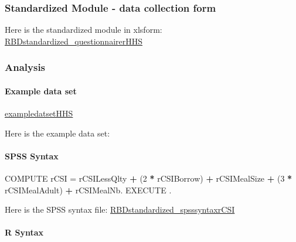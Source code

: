 \documentclass[
]{article}
\newenvironment{Shaded}{\begin{snugshade}}{\end{snugshade}}
\newcommand{\DecValTok}[1]{\textcolor[rgb]{0.00,0.00,0.81}{#1}}
\newcommand{\NormalTok}[1]{#1}
\newcommand{\OperatorTok}[1]{\textcolor[rgb]{0.81,0.36,0.00}{\textbf{#1}}}
\newcommand{\StringTok}[1]{\textcolor[rgb]{0.31,0.60,0.02}{#1}}
\begin{document}
\hypertarget{standardized-module---data-collection-form-1}{%
\subsubsection{Standardized Module - data collection form}\label{standardized-module---data-collection-form-1}}

Here is the standardized module in xlsform: \href{https://www.dropbox.com/s/a7e4ty3rvw19e89/RBDstandardized_questionnaireHHS.xlsx?dl=0}{RBDstandardized\_questionnairerHHS}

\hypertarget{analysis-1}{%
\subsubsection{Analysis}\label{analysis-1}}

\hypertarget{example-data-set-1}{%
\paragraph{Example data set}\label{example-data-set-1}}

\href{https://www.dropbox.com/sh/g2s87u60cc0yx6v/AABdYDfCkJlyP1DlgRoEc0gDa?dl=0}{exampledatsetHHS}

Here is the example data set:

\hypertarget{spss-syntax-1}{%
\paragraph{SPSS Syntax}\label{spss-syntax-1}}

\begin{Shaded}
\begin{Highlighting}[]
\NormalTok{COMPUTE rCSI =}\StringTok{ }\NormalTok{rCSILessQlty  }\OperatorTok{+}\StringTok{ }\NormalTok{(}\DecValTok{2} \OperatorTok{*}\StringTok{ }\NormalTok{rCSIBorrow) }\OperatorTok{+}\StringTok{ }\NormalTok{rCSIMealSize }\OperatorTok{+}\StringTok{ }\NormalTok{(}\DecValTok{3} \OperatorTok{*}\StringTok{ }\NormalTok{rCSIMealAdult) }\OperatorTok{+}\StringTok{ }\NormalTok{rCSIMealNb.}
\NormalTok{EXECUTE .}
\end{Highlighting}
\end{Shaded}

Here is the SPSS syntax file:
\href{https://www.dropbox.com/s/gsj4tvadww9v3q4/RBDstandardized_questionnairerCSI.xlsx?dl=0}{RBDstandardized\_spsssyntaxrCSI}

\hypertarget{r-syntax-1}{%
\paragraph{R Syntax}\label{r-syntax-1}}
\end{document}
